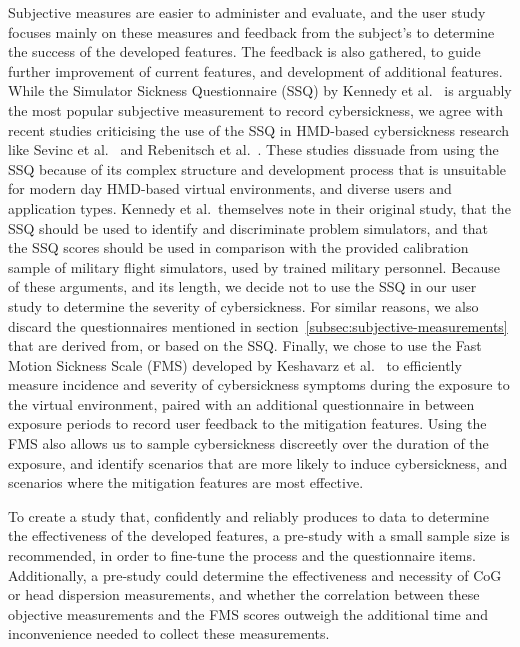 Subjective measures are easier to administer and evaluate, and the user study focuses mainly on these measures and
feedback from the subject's to determine the success of the developed features.
The feedback is also gathered, to guide further improvement of current features, and development of additional
features.
While the Simulator Sickness Questionnaire (SSQ) by Kennedy et al.~\cite{Kennedy1993} is arguably the most popular
subjective measurement to record cybersickness, we agree with recent studies criticising the use of the SSQ in
HMD-based cybersickness research like Sevinc et al.~\cite{Sevinc2020} and Rebenitsch et al.~\cite{Rebenitsch2016}.
These studies dissuade from using the SSQ because of its complex structure and development process that is unsuitable
for modern day HMD-based virtual environments, and diverse users and application types.
Kennedy et al.\ themselves note in their original study, that the SSQ should be used to identify and discriminate
problem simulators, and that the SSQ scores should be used in comparison with the provided calibration sample of
military flight simulators, used by trained military personnel.
Because of these arguments, and its length, we decide not to use the SSQ in our user study to determine the severity
of cybersickness.
For similar reasons, we also discard the questionnaires mentioned in section~\ref{subsec:subjective-measurements}
that are derived from, or based on the SSQ\@.
Finally, we chose to use the Fast Motion Sickness Scale (FMS) developed by Keshavarz et al.~\cite{Keshavarz2011} to
efficiently measure incidence and severity of cybersickness symptoms during the exposure to the virtual environment,
paired with an additional questionnaire in between exposure periods to record user feedback to the mitigation features.
Using the FMS also allows us to sample cybersickness discreetly over the duration of the exposure, and identify
scenarios that are more likely to induce cybersickness, and scenarios where the mitigation features are most effective.

To create a study that, confidently and reliably produces to data to determine the effectiveness of the developed
features, a pre-study with a small sample size is recommended, in order to fine-tune the process and the
questionnaire items.
Additionally, a pre-study could determine the effectiveness and necessity of CoG or head dispersion measurements, and
whether the correlation between these objective measurements and the FMS scores outweigh the additional time and
inconvenience needed to collect these measurements.


